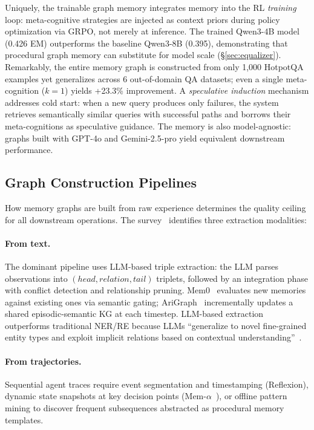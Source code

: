 \documentclass[hf]{ceurart}
\begin{document}
Uniquely, the trainable graph memory integrates memory into the RL
\emph{training} loop: meta-cognitive strategies are injected as
context priors during policy optimization via GRPO, not merely at
inference. The trained
Qwen3-4B model (0.426 EM) outperforms the baseline Qwen3-8B (0.395),
demonstrating that procedural graph memory can substitute for model
scale (\S\ref{sec:equalizer}). Remarkably, the entire memory graph
is constructed from only 1,000 HotpotQA examples yet generalizes
across 6 out-of-domain QA datasets; even a single meta-cognition
($k{=}1$) yields +23.3\% improvement. A \emph{speculative induction}
mechanism addresses cold start: when a new query produces only
failures, the system retrieves semantically similar queries with
successful paths and borrows their meta-cognitions as speculative
guidance. The memory is also model-agnostic: graphs built with GPT-4o
and Gemini-2.5-pro yield equivalent downstream performance.

\subsection{Graph Construction Pipelines}

How memory graphs are built from raw experience determines the
quality ceiling for all downstream operations. The
survey~\cite{graphmemsurvey2026} identifies three extraction
modalities:

\paragraph{From text.}
The dominant pipeline uses LLM-based triple extraction:
the LLM parses observations into $(head, relation, tail)$ triplets,
followed by an integration phase with conflict detection and
relationship pruning. Mem0~\cite{mem0_2025} evaluates new memories
against existing ones via semantic gating; AriGraph~\cite{arigraph2025}
incrementally updates a shared episodic-semantic KG at each timestep.
LLM-based extraction outperforms traditional NER/RE because LLMs
``generalize to novel fine-grained entity types and exploit implicit
relations based on contextual understanding''~\cite{graphmemsurvey2026}.

\paragraph{From trajectories.}
Sequential agent traces require event segmentation and timestamping
(Reflexion), dynamic state snapshots at key decision points
(Mem-$\alpha$~\cite{memalpha2025}), or offline pattern mining to
discover frequent subsequences abstracted as procedural memory
templates.
\end{document}
